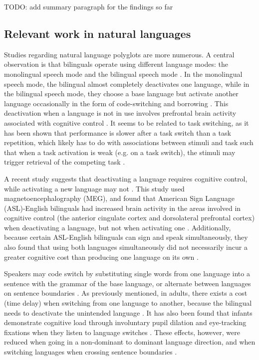 \documentclass[a4paper,UKenglish,cleveref, autoref]{oasics-v2019}
\begin{document}
TODO: add summary paragraph for the findings so far 

\subsection{Relevant work in natural languages}
Studies regarding natural language polyglots are more numerous. A central observation is that bilinguals operate using different language modes: the monolingual speech mode and the bilingual speech mode \cite{pl0046}. In the monolingual speech mode, the bilingual almost completely deactivates one language, while in the bilingual speech mode, they choose a base language but activate another language occasionally in the form of code-switching and borrowing \cite{pl0046}. This deactivation when a language is not in use involves prefrontal brain activity associated with cognitive control \cite{pl0048}. It seems to be related to task switching, as it has been shown that performance is slower after a task switch than a task repetition, which likely has to do with associations between stimuli and task such that when a task activation is weak (e.g. on a task switch), the stimuli may trigger retrieval of the competing task \cite{pl0031}. 

A recent study suggests that deactivating a language requires cognitive control, while activating a new language may not \cite{pl0029}. This study used magnetoencephalography (MEG), and found that American Sign Language (ASL)-English bilinguals had increased brain activity in the areas involved in cognitive control (the anterior cingulate cortex and dorsolateral prefrontal cortex) when deactivating a language, but not when activating one \cite{pl0029}. Additionally, because certain ASL-English bilinguals can sign and speak simultaneously, they also found that using both languages simultaneously did not necessarily incur a greater cognitive cost than producing one language on its own \cite{pl0029}. 

Speakers may code switch by substituting single words from one language into a sentence with the grammar of the base language, or alternate between languages on sentence boundaries \cite{pl0034}. As previously mentioned, in adults, there exists a cost (time delay) when switching from one language to another, because the bilingual needs to deactivate the unintended language \cite{pl0050}. It has also been found that infants demonstrate cognitive load through involuntary pupil dilation and eye-tracking fixations when they listen to language switches \cite{pl0028}. These effects, however, were reduced when going in a non-dominant to dominant language direction, and when switching languages when crossing sentence boundaries \cite{pl0028}. 
\end{document}
